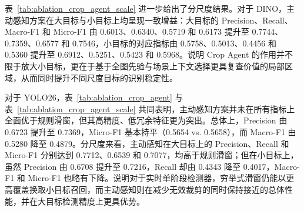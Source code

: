 \begin{table}[htbp]
    \centering
    \caption{不同候选裁剪策略下的分尺度检测指标对比}
    \label{tab:ablation_crop_agent_scale}
\end{table}

表~\ref{tab:ablation_crop_agent_scale} 进一步给出了分尺度结果。对于 DINO，主动感知方案在大目标与小目标上均呈现一致增益：大目标的 Precision、Recall、Macro-F1 和 Micro-F1 由 0.6013、0.6340、0.5719 和 0.6173 提升至 0.7744、0.7359、0.6577 和 0.7546，小目标的对应指标由 0.5758、0.5013、0.4456 和 0.5360 提升至 0.6912、0.5251、0.5423 和 0.5968。说明 Crop Agent 的作用并不限于放大小目标，更在于基于全图先验与场景上下文选择更具复查价值的局部区域，从而同时提升不同尺度目标的识别稳定性。

对于 YOLO26，表~\ref{tab:ablation_crop_agent} 与表~\ref{tab:ablation_crop_agent_scale} 共同表明，主动感知方案并未在所有指标上全面优于规则滑窗，但其高精度、低冗余特征更为突出。总体上，Precision 由 0.6723 提升至 0.7369，Micro-F1 基本持平（0.5654 vs. 0.5658），而 Macro-F1 由 0.5280 降至 0.4879。分尺度来看，主动感知在大目标上的 Precision、Recall 和 Micro-F1 分别达到 0.7712、0.6539 和 0.7077，均高于规则滑窗；但在小目标上，虽然 Precision 由 0.6708 提升至 0.7216，Recall 却由 0.4343 降至 0.4017，Macro-F1 和 Micro-F1 也略有下降。说明对于实时单阶段检测器，穷举式滑窗仍能以更高覆盖换取小目标召回，而主动感知则在减少无效裁剪的同时保持接近的总体性能，并在大目标检测精度上更具优势。


